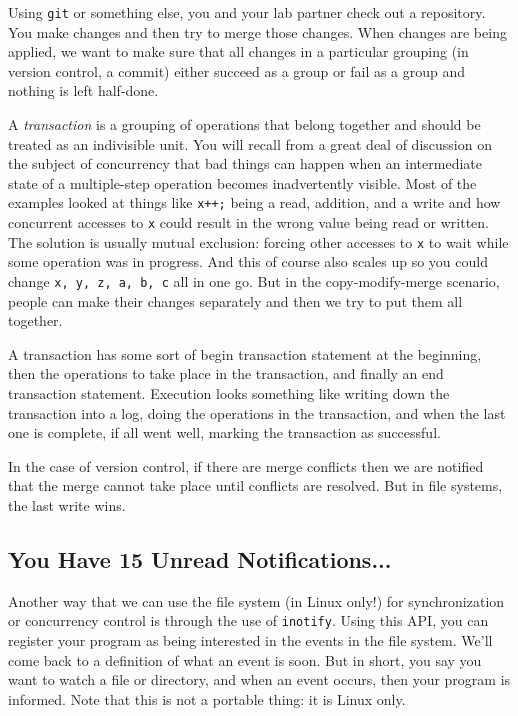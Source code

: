 \documentclass[a4paper]{report}
\begin{document}
Using \texttt{git} or something else, you and your lab partner check out a repository. You make changes and then try to merge those changes. When changes are being applied, we want to make sure that all changes in a particular grouping (in version control, a commit) either succeed as a group or fail as a group and nothing is left half-done.

A \textit{transaction} is a grouping of operations that belong together and should be treated as an indivisible unit. You will recall from a great deal of discussion on the subject of concurrency that bad things can happen when an intermediate state of a multiple-step operation becomes inadvertently visible. Most of the examples looked at things like \texttt{x++;} being a read, addition, and a write and how concurrent accesses to \texttt{x} could result in the wrong value being read or written. The solution is usually mutual exclusion: forcing other accesses to \texttt{x} to wait while some operation was in progress. And this of course also scales up so you could change \texttt{x, y, z, a, b, c} all in one go. But in the copy-modify-merge scenario, people can make their changes separately and then we try to put them all together.

A transaction has some sort of begin transaction statement at the beginning, then the operations to take place in the transaction, and finally an end transaction statement. Execution looks something like writing down the transaction into a log, doing the operations in the transaction, and when the last one is complete, if all went well, marking the transaction as successful.

In the case of version control, if there are merge conflicts then we are notified that the merge cannot take place until conflicts are resolved. But in file systems, the last write wins.

\subsection*{You Have 15 Unread Notifications...}

Another way that we can use the file system (in Linux only!) for synchronization or concurrency control is through the use of \texttt{inotify}. Using this API, you can register your program as being interested in the events in the file system. We'll come back to a definition of what an event is soon. But in short, you say you want to watch a file or directory, and when an event occurs, then your program is informed. Note that this is not a portable thing: it is Linux only.
\end{document}
